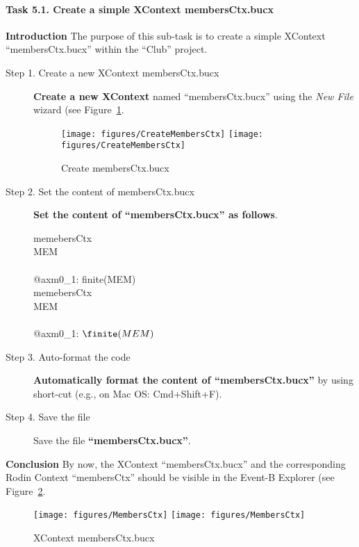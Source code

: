 \paragraph{Task 5.1. Create a simple XContext membersCtx.bucx}
\textbf{Introduction} The purpose of this sub-task is to create a simple XContext ``membersCtx.bucx'' within the ``Club'' project.
\begin{description}
\item[Step 1. Create a new XContext membersCtx.bucx] \textbf{Create a new XContext} named ``membersCtx.bucx'' using the \emph{New File} wizard (see Figure~\ref{fig:CreateMembersCtx}.
  \begin{figure}[!htbp]
    \centering
    \texttt{[image: figures/CreateMembersCtx]}
    \else
    \texttt{[image: figures/CreateMembersCtx]}
    \endif
    \caption{Create membersCtx.bucx}
    \label{fig:CreateMembersCtx}
  \end{figure}

\item[Step 2. Set the content of membersCtx.bucx] \textbf{Set the content of ``membersCtx.bucx'' as follows}.
  \begin{center}
    \begin{Bcode}
      \Bcontext{} memebersCtx\\
      \Bsets{} MEM\\
      \Baxioms\\
      @axm0_1: finite(MEM)\\
      \Bend
      \else
      \Bcontext{} memebersCtx\\
      \Bsets{} MEM\\
      \Baxioms\\
      \Btab @axm0_1: \(\finite(MEM)\)\\
      \Bend
      \endif
    \end{Bcode}
  \end{center}

\item [Step 3. Auto-format the code] \textbf{Automatically format the content of ``membersCtx.bucx''} by using short-cut (e.g., on Mac OS: Cmd+Shift+F).

\item[Step 4. Save the file] Save the file \textbf{``membersCtx.bucx''}.
\end{description}

\textbf{Conclusion} By now, the XContext ``membersCtx.bucx'' and the corresponding Rodin Context ``membersCtx'' should be visible in the Event-B Explorer (see Figure~\ref{fig:membersCtx}.
  \begin{figure}[!htbp]
    \centering
    \texttt{[image: figures/MembersCtx]}
    \else
    \texttt{[image: figures/MembersCtx]}
    \endif
    \caption{XContext membersCtx.bucx}
    \label{fig:membersCtx}
  \end{figure}

